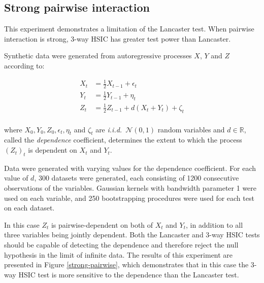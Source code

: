 \documentclass[]{article}
\begin{document}
\subsection{Strong pairwise interaction}\label{experiment3}
This experiment demonstrates a limitation of the Lancaster test. When pairwise interaction is strong, 3-way HSIC has greater test power than Lancaster.

Synthetic data were generated from autoregressive processes $X$, $Y$ and $Z$ according to:

\begin{align*}
X_t &= \frac{1}{2}X_{t-1} + \epsilon_t\\
Y_t &= \frac{1}{2}Y_{t-1} + \eta_t\\
Z_t &= \frac{1}{2}Z_{t-1} + d(X_t + Y_t) + \zeta_t\\
\end{align*}

where $X_0, Y_0, Z_0, \epsilon_t, \eta_t$ and $\zeta_t$ are \emph{i.i.d.}~$\mathcal{N}(0,1)$ random variables and $d\in\mathbb{R}$, called the \emph{dependence} coefficient, determines the extent to which the process $(Z_t)_t$ is dependent on $X_t$ and $Y_t$.

Data were generated with varying values for the dependence coefficient. For each value of $d$, 300 datasets were generated, each consisting of 1200 consecutive observations of the variables. Gaussian kernels with bandwidth parameter 1 were used on each variable, and 250 bootstrapping procedures were used for each test on each dataset.

In this case $Z_t$ is pairwise-dependent on both of $X_t$ and $Y_t$, in addition to all three variables being jointly dependent. Both the Lancaster and 3-way HSIC tests should be capable of detecting the dependence and therefore reject the null hypothesis in the limit of infinite data. The results of this experiment are presented in Figure \ref{strong-pairwise}, which demonstrates that in this case the 3-way HSIC test is more sensitive to the dependence than the Lancaster test.
\end{document}
